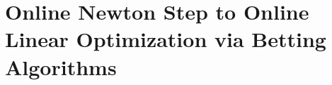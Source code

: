 \documentclass[12pt]{colt2018} %
\newcommand{\w}{\mathring{w}}
\begin{document}
%     
% 
% 
% 

\section{Online Newton Step to Online Linear Optimization via Betting Algorithms}\label{sec:betfromons}
\end{document}
